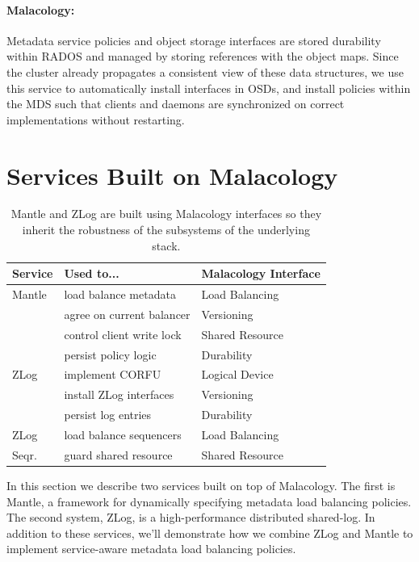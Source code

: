 \documentclass[preprint]{sigplanconf-eurosys}
\begin{document}
\paragraph*{Malacology:} Metadata service policies and object storage
interfaces are stored durability within RADOS and managed by storing references
with the object maps. Since the cluster already propagates a consistent view of
these data structures, we use this service to automatically install interfaces
in OSDs, and install policies within the MDS such that clients and daemons are
synchronized on correct implementations without restarting.

\section{Services Built on Malacology}
\label{sec:services}
\label{services-built-on-malacology}

\label{services}
\begin{table}
\centering
\begin{tabular}{  l | l | l }
\textbf{Service}              &
\textbf{Used to...}           &
\textbf{Malacology Interface} \\ \hline
Mantle & load balance metadata     & Load Balancing  \\
       & agree on current balancer & Versioning      \\ 
       & control client write lock & Shared Resource \\
       & persist policy logic      & Durability      \\ \hline
ZLog   & implement CORFU           & Logical Device  \\ 
       & install ZLog interfaces   & Versioning      \\
       & persist log entries       & Durability      \\ \hline
ZLog   & load balance sequencers   & Load Balancing  \\
Seqr.  & guard shared resource     & Shared Resource \\ 
\end{tabular}
\caption{Mantle and ZLog are built using Malacology interfaces so they inherit the
robustness of the subsystems of the underlying stack.}
\label{table:implementation}
\end{table}

In this section we describe two services built on top of Malacology. The first
is Mantle, a framework for dynamically specifying metadata load balancing
policies. The second system, ZLog, is a high-performance distributed shared-log.
In addition to these services, we'll demonstrate how we combine ZLog and Mantle
to implement service-aware metadata load balancing policies.
\end{document}
